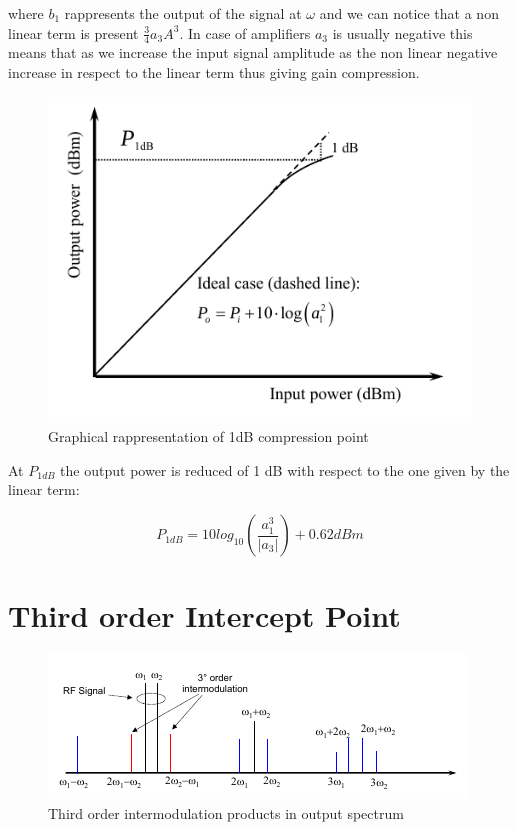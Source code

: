 where $b_1$ rappresents the output of the signal at $\omega$ and we can notice that a non linear term is present $\frac{3}{4}a_3A^3$.
In case of amplifiers $a_3$ is usually negative this means that as we increase the input signal amplitude as the non linear negative increase in respect to the linear term thus giving gain compression.

\begin{figure}[h]
	\centering
	\includegraphics[scale=0.5]{Immagini/1db}
	\caption{Graphical rappresentation of 1dB compression point}
	\label{fig:1db}
\end{figure}


At $P_{1dB}$ the output power is reduced of 1 dB with respect to the one given by the linear term:

\begin{equation}
	P_{1dB}= 10log_{10}\left( \frac{a_1^3}{|a_3|} \right)+0.62dBm
\end{equation}



\section{Third order Intercept Point} %
\label{sec:third_order_intercept_point}

\begin{figure}[h]
	\centering
	\includegraphics[scale=0.8]{Immagini/spec}
	\caption{Third order intermodulation products in output spectrum}
	\label{fig:spec}
\end{figure}

